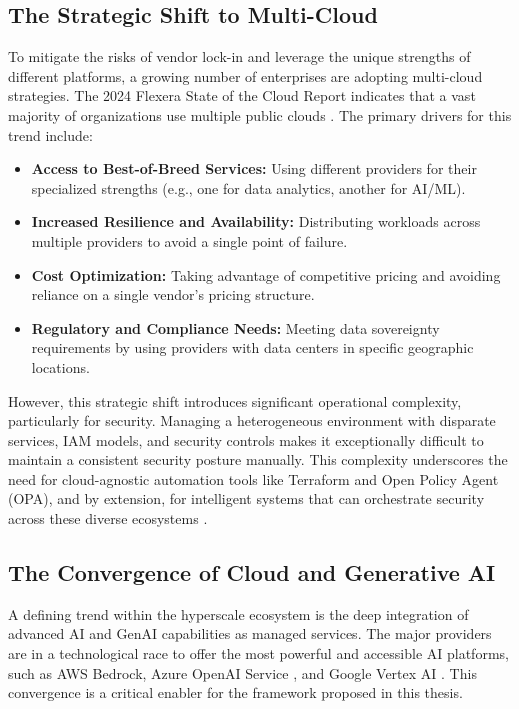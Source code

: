 \subsection{The Strategic Shift to Multi-Cloud}
To mitigate the risks of vendor lock-in and leverage the unique strengths of different platforms, a growing number of enterprises are adopting multi-cloud strategies. The 2024 Flexera State of the Cloud Report indicates that a vast majority of organizations use multiple public clouds \cite{flexera_flexera_2024}. The primary drivers for this trend include:
\begin{itemize}
    \item \textbf{Access to Best-of-Breed Services:} Using different providers for their specialized strengths (e.g., one for data analytics, another for AI/ML).
    \item \textbf{Increased Resilience and Availability:} Distributing workloads across multiple providers to avoid a single point of failure.
    \item \textbf{Cost Optimization:} Taking advantage of competitive pricing and avoiding reliance on a single vendor's pricing structure.
    \item \textbf{Regulatory and Compliance Needs:} Meeting data sovereignty requirements by using providers with data centers in specific geographic locations.
\end{itemize}
However, this strategic shift introduces significant operational complexity, particularly for security. Managing a heterogeneous environment with disparate services, IAM models, and security controls makes it exceptionally difficult to maintain a consistent security posture manually. This complexity underscores the need for cloud-agnostic automation tools like Terraform and Open Policy Agent (OPA), and by extension, for intelligent systems that can orchestrate security across these diverse ecosystems \cite{dasari_infrastructure_2025}.

\subsection{The Convergence of Cloud and Generative AI}
A defining trend within the hyperscale ecosystem is the deep integration of advanced AI and GenAI capabilities as managed services. The major providers are in a technological race to offer the most powerful and accessible AI platforms, such as AWS Bedrock\cite{noauthor_claude_nodate}, Azure OpenAI Service \cite{microsoft_what_2024}, and Google Vertex AI \cite{noauthor_ground_nodate}. This convergence is a critical enabler for the framework proposed in this thesis.

